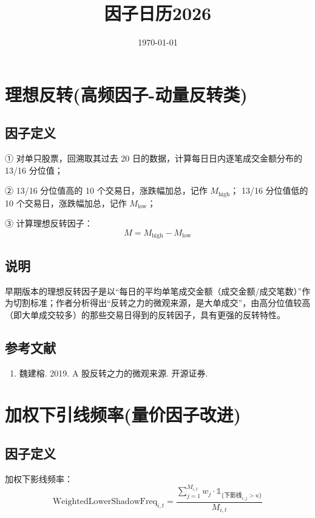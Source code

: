 \documentclass{article}
\title{因子日历2026}
\date{\today}
\begin{document}
\maketitle

\section{理想反转(高频因子-动量反转类)}

\subsection{因子定义}


① 对单只股票，回溯取其过去 20 日的数据，计算每日日内逐笔成交金额分布的 13/16 分位值；

② 13/16 分位值高的 10 个交易日，涨跌幅加总，记作 \( M_{\text{high}} \)；
13/16 分位值低的 10 个交易日，涨跌幅加总，记作 \( M_{\text{low}} \)；

③ 计算理想反转因子：
\begin{equation}
    M = M_{\text{high}} - M_{\text{low}}
\end{equation}

\subsection{说明}
早期版本的理想反转因子是以“每日的平均单笔成交金额（成交金额/成交笔数）”作为切割标准；作者分析得出“反转之力的微观来源，是大单成交”，由高分位值较高（即大单成交较多）的那些交易日得到的反转因子，具有更强的反转特性。

\subsection{参考文献}
\begin{enumerate}
    \item 魏建榕. 2019. A 股反转之力的微观来源. 开源证券.
\end{enumerate}

\section{加权下引线频率(量价因子改进)}

\subsection{因子定义}

加权下影线频率：
\begin{equation}
    \mathrm{WeightedLowerShadowFreq}_{i,t} = \frac{\sum_{j=1}^{M_{i,t}} w_j \cdot \mathbb{1}_{\{ \text{下影线}_{i,j} > u \}}}{M_{i,t}}
\end{equation}
\end{document}
